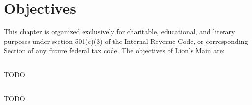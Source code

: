 \chapter{Objectives}\label{sec:objectives}

This chapter is organized exclusively for charitable, educational, and literary purposes under section 501(c)(3) of the Internal Revenue Code, or corresponding Section of any future federal tax code. The objectives of Lion's Main are:

\section{}
TODO

\section{}
TODO
